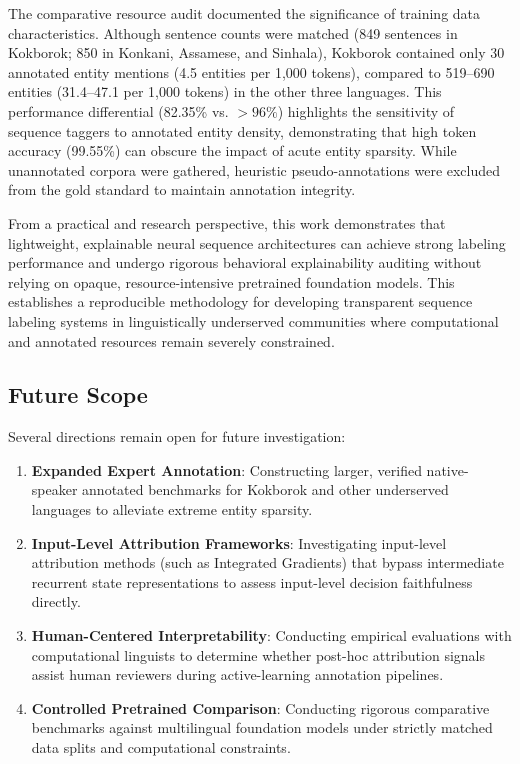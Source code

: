 \documentclass[pdflatex,sn-mathphys-num]{sn-jnl}
\begin{document}
The comparative resource audit documented the significance of training data characteristics. Although sentence counts were matched (849 sentences in Kokborok; 850 in Konkani, Assamese, and Sinhala), Kokborok contained only 30 annotated entity mentions (4.5 entities per 1,000 tokens), compared to 519--690 entities (31.4--47.1 per 1,000 tokens) in the other three languages. This performance differential (82.35\% vs. $>96\%$) highlights the sensitivity of sequence taggers to annotated entity density, demonstrating that high token accuracy (99.55\%) can obscure the impact of acute entity sparsity. While unannotated corpora were gathered, heuristic pseudo-annotations were excluded from the gold standard to maintain annotation integrity.

From a practical and research perspective, this work demonstrates that lightweight, explainable neural sequence architectures can achieve strong labeling performance and undergo rigorous behavioral explainability auditing without relying on opaque, resource-intensive pretrained foundation models. This establishes a reproducible methodology for developing transparent sequence labeling systems in linguistically underserved communities where computational and annotated resources remain severely constrained.

\subsection{Future Scope}\label{subsec:future_scope}
\enlargethispage{3\baselineskip}

Several directions remain open for future investigation:
\begin{enumerate}
    \item \textbf{Expanded Expert Annotation}: Constructing larger, verified native-speaker annotated benchmarks for Kokborok and other underserved languages to alleviate extreme entity sparsity.
    \item \textbf{Input-Level Attribution Frameworks}: Investigating input-level attribution methods (such as Integrated Gradients) that bypass intermediate recurrent state representations to assess input-level decision faithfulness directly.
    \item \textbf{Human-Centered Interpretability}: Conducting empirical evaluations with computational linguists to determine whether post-hoc attribution signals assist human reviewers during active-learning annotation pipelines.
    \item \textbf{Controlled Pretrained Comparison}: Conducting rigorous comparative benchmarks against multilingual foundation models under strictly matched data splits and computational constraints.
\end{enumerate}
\end{document}
